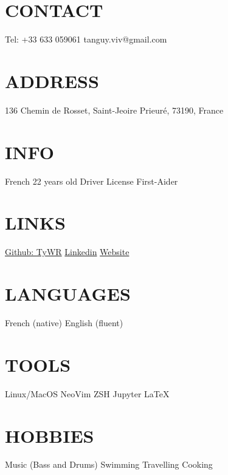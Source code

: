 \documentclass[]{cv-style}
\begin{document}
%
\begin{aside}
%
\section{CONTACT}\vspace{0.1cm}
Tel: +33 633 059061
tanguy.viv@gmail.com
%
\section{ADDRESS}\vspace{0.1cm}
136 Chemin de Rosset,
Saint-Jeoire Prieuré,
73190,
France
%
\section{INFO}\vspace{0.1cm}
French
22 years old
Driver License
First-Aider
%
\section{LINKS}\vspace{0.1cm}
\href{https://github.com/TyWR}{Github: TyWR}
\href{https://www.linkedin.com/in/tanguy-vivier/}{Linkedin}
\href{https://tywr.github.io/}{Website}
%
\section{LANGUAGES}\vspace{0.1cm}
French (native)
English (fluent)
%
\section{TOOLS}\vspace{0.1cm}
Linux/MacOS
NeoVim
ZSH
Jupyter
\LaTeX{}
%
\section{HOBBIES} \vspace{0.1cm}
Music
(Bass and Drums)
Swimming
Travelling
Cooking
%
\end{aside}
\vspace{0.12cm}
\end{document}
